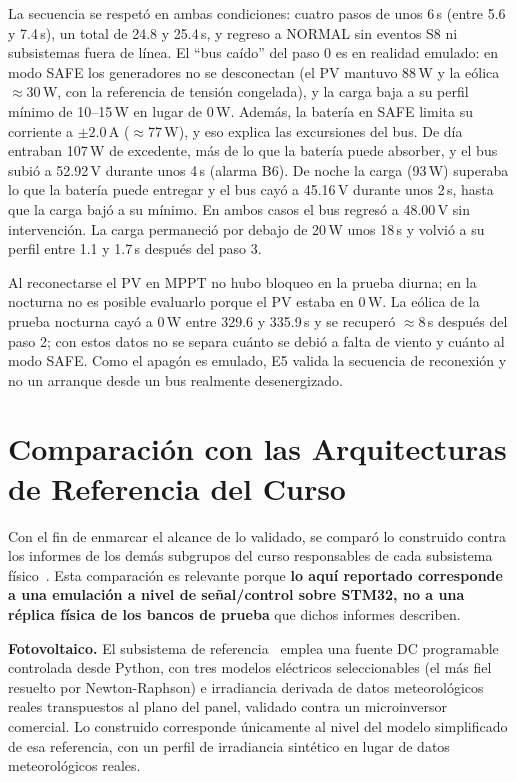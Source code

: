 \documentclass[conference]{IEEEtran}
\begin{document}
La secuencia se respetó en ambas condiciones: cuatro pasos de unos 6\,s (entre 5.6 y 7.4\,s), un total de 24.8 y 25.4\,s, y regreso a NORMAL sin eventos S8 ni subsistemas fuera de línea. El ``bus caído'' del paso 0 es en realidad emulado: en modo SAFE los generadores no se desconectan (el PV mantuvo 88\,W y la eólica $\approx$30\,W, con la referencia de tensión congelada), y la carga baja a su perfil mínimo de 10--15\,W en lugar de 0\,W. Además, la batería en SAFE limita su corriente a $\pm2.0$\,A ($\approx$77\,W), y eso explica las excursiones del bus. De día entraban 107\,W de excedente, más de lo que la batería puede absorber, y el bus subió a 52.92\,V durante unos 4\,s (alarma B6). De noche la carga (93\,W) superaba lo que la batería puede entregar y el bus cayó a 45.16\,V durante unos 2\,s, hasta que la carga bajó a su mínimo. En ambos casos el bus regresó a 48.00\,V sin intervención. La carga permaneció por debajo de 20\,W unos 18\,s y volvió a su perfil entre 1.1 y 1.7\,s después del paso 3.

Al reconectarse el PV en MPPT no hubo bloqueo en la prueba diurna; en la nocturna no es posible evaluarlo porque el PV estaba en 0\,W. La eólica de la prueba nocturna cayó a 0\,W entre 329.6 y 335.9\,s y se recuperó $\approx$8\,s después del paso 2; con estos datos no se separa cuánto se debió a falta de viento y cuánto al modo SAFE. Como el apagón es emulado, E5 valida la secuencia de reconexión y no un arranque desde un bus realmente desenergizado.

\section{Comparación con las Arquitecturas de Referencia del Curso}
\label{sec:comparacion}\label{app:comp}

Con el fin de enmarcar el alcance de lo validado, se comparó lo construido contra los informes de los demás subgrupos del curso responsables de cada subsistema físico~\cite{gonzalez2026eolica,aristizabal2026pv,alvarez2026scada,hernandez2026carga,pinto2026peb,vega2026bateria}. Esta comparación es relevante porque \textbf{lo aquí reportado corresponde a una emulación a nivel de señal/control sobre STM32, no a una réplica física de los bancos de prueba} que dichos informes describen.

\textbf{Fotovoltaico.} El subsistema de referencia~\cite{aristizabal2026pv} emplea una fuente DC programable controlada desde Python, con tres modelos eléctricos seleccionables (el más fiel resuelto por Newton-Raphson) e irradiancia derivada de datos meteorológicos reales transpuestos al plano del panel, validado contra un microinversor comercial. Lo construido corresponde únicamente al nivel del modelo simplificado de esa referencia, con un perfil de irradiancia sintético en lugar de datos meteorológicos reales.
\end{document}
